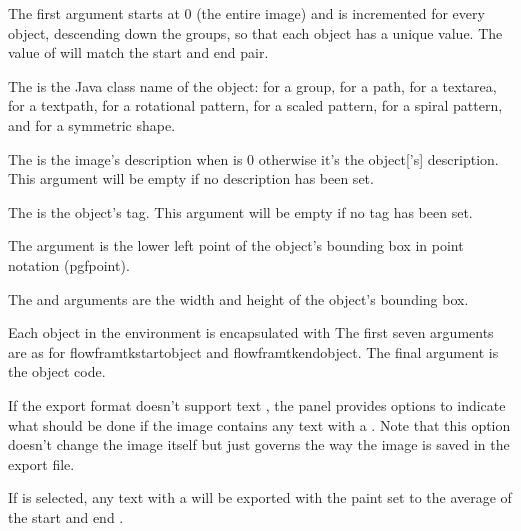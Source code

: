 The first argument  starts at 0 (the entire image) and is
incremented for every \gls{object}, descending down the
\glspl{group}, so that each \gls{object} has a unique value.
The value of  will match the start and end pair.

The  is the Java class name of the \gls{object}:
 for a \gls{group},  for a \gls{path},
 for a \gls{textarea},
 for a \gls{textpath},
 for a rotational \gls{pattern},
 for a scaled \gls{pattern},
 for a spiral \gls{pattern}, and
 for a symmetric shape.

The  is the image's description when  is 0
otherwise it's the \gls{object}['s] description. This argument will
be empty if no description has been set.

The  is the object's tag. This argument will be empty if
no tag has been set.

The  argument is the lower left point of the object's bounding
box in  point notation (\gls{pgfpoint}).

The  and  arguments are the width and
height of the object's bounding box.


Each object in the  environment is encapsulated with
The first seven arguments are as for \gls{flowframtkstartobject}
and \gls{flowframtkendobject}. The final argument is the object
code.


If the export format doesn't support text , the
 panel provides options to indicate
what should be done if the image contains any text with a 
. Note that this option doesn't change
the image itself but just governs the way the image is saved in the export
file.


If  is selected, any text
with a  will be exported with the paint set to
the average of the start and end .


